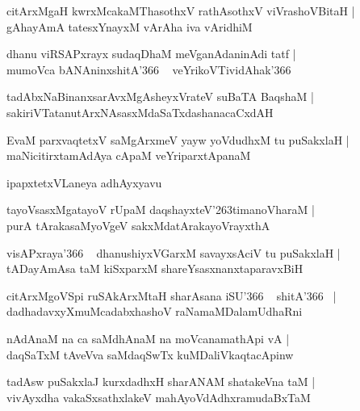 \documentclass[twoside,12pt,openright]{book}
\def\S{\char'263}
\newcounter{shloka}[chapter]
\begin{document}
\begin{shloka}%
citArxMgaH kwrxMcakaMThasothxV rathAsothxV viVrashoVBitaH |\\
gAhayAmA tatesxYnayxM vArAha iva vAridhiM 
\end{shloka}

\begin{shloka}%
dhanu viRSAPxrayx sudaqDhaM meVganAdaninAdi tatf |\\
mumoVca bANAninxshitA\char'366 ~ veYrikoVTividAhak\char'366 
\end{shloka}

\begin{shloka}%
tadAbxNaBinanxsarAvxMgAsheyxVrateV suBaTA BaqshaM |\\
sakiriVTatanutArxNAsasxMdaSaTxdashanacaCxdAH 
\end{shloka}

\begin{shloka}%
EvaM parxvaqtetxV saMgArxmeV yayw yoVdudhxM tu puSakxlaH |\\
maNicitirxtamAdAya cApaM veYriparxtApanaM 
\end{shloka}

\begin{center}
ipapxtetxVLaneya adhAyxyavu
\end{center}

\begin{shloka}%
tayoVsasxMgatayoV rUpaM daqshayxteV\S timanoVharaM |\\
purA tArakasaMyoVgeV sakxMdatArakayoVrayxthA 
\end{shloka}

\begin{shloka}%
visAPxraya\char'366 ~ dhanushiyxVGarxM savayxsAciV tu puSakxlaH |\\
tADayAmAsa taM kiSxparxM shareYsasxnanxtaparavxBiH 
\end{shloka}

\begin{shloka}%
citArxMgoVSpi ruSAkArxMtaH sharAsana iSU\char'366 ~ shitA\char'366 ~|\\
dadhadavxyXmuMcadabxhashoV raNamaMDalamUdhaRni 
\end{shloka}

\begin{shloka}%
nAdAnaM  na ca saMdhAnaM na moVcanamathApi vA |\\
daqSaTxM tAveVva saMdaqSwTx kuMDaliVkaqtacApinw
\end{shloka}

\begin{shloka}%
tadAsw puSakxlaJ kurxdadhxH sharANAM shatakeVna taM |\\
vivAyxdha vakaSxsathxlakeV mahAyoVdAdhxramudaBxTaM 
\end{shloka}
\end{document}
